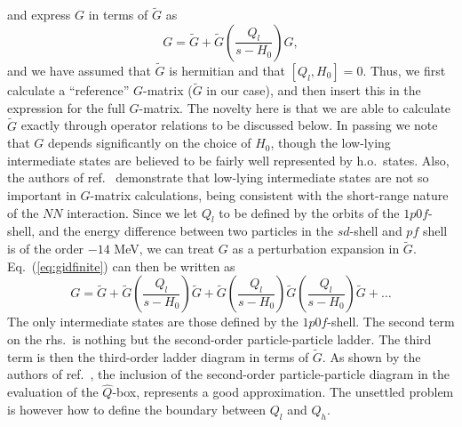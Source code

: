and  express $G$ in terms of $\tilde{G}$ as
\begin{equation}
        G=\tilde{G} +\tilde{G}
        \left(\frac{Q_l}{s -H_0}\right)G,
        \label{eq:gidfinite}
\end{equation}
and we have assumed that $\tilde{G}$ is hermitian and that $[Q_l,H_0]=0$.
Thus, we first calculate
a ``reference'' $G$-matrix ($\tilde{G}$ in our case), and then insert this
in the expression for the full $G$-matrix. The novelty here is that
we are able to calculate $\tilde{G}$ exactly through operator relations
to be discussed below. In passing we note that $G$ depends significantly 
on the choice of $H_0$, though the low-lying intermediate states
are believed to be fairly well represented by h.o.\ states. 
Also, the authors of ref.\ \cite{kkko76} demonstrate that low-lying
intermediate states are not so important in $G$-matrix calculations,
being consistent with the short-range nature of the $NN$ interaction.
Since we let $Q_l$ to be defined by the orbits of the $1p0f$-shell,
and the energy difference between two particles in the 
$sd$-shell and $pf$ shell is of the order $-14$ MeV, we can treat 
$G$ as a perturbation expansion in $\tilde{G}$.
Eq.\ (\ref{eq:gidfinite}) can then be written as 
\begin{equation}
        G=\tilde{G} +\tilde{G}
        \left(\frac{Q_l}{s -H_0}\right)\tilde{G}
        +\tilde{G}
        \left(\frac{Q_l}{s -H_0}\right)\tilde{G}
        \left(\frac{Q_l}{s -H_0}\right)\tilde{G} +\dots
\end{equation}
The only intermediate states are those defined by the $1p0f$-shell.
The second term on the rhs.\ is nothing but the second-order 
particle-particle ladder. The third term is then the third-order ladder
diagram in terms of
$\tilde{G}$. As shown by the authors of ref.\ \cite{kkko76}, the inclusion
of the second-order particle-particle diagram in the evaluation
of the $\hat{Q}$-box, represents a good approximation. 
The unsettled problem is however how to define
the boundary between 
$Q_l$ and $Q_h$. 


